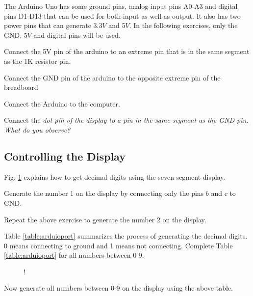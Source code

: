 The Arduino Uno has some ground pins, analog input pins A0-A3 and digital pins D1-D13 that can be used for both input as well as output. It also has two power pins that can generate 3.3$V$ and 5$V$.  In the following exercises, only the GND, 5$V$ and digital pins will be used.
%
%
\begin{problem}
	Connect the 5V pin of the arduino to an  extreme pin that is in the same segment as the 1K resistor pin. 
	\end{problem}	
\begin{problem}
	Connect the GND pin of the arduino to the opposite extreme pin of the breadboard
\end{problem}
\begin{problem}
	Connect the Arduino to the computer.
\end{problem}
\begin{problem}
	Connect the \em{dot} pin of the display to a pin in the same segment as the GND pin.  What do you observe?
\end{problem}
\subsection{Controlling the Display}
Fig. \ref{fig:sevenseg12} explains how to get decimal digits using the seven segment display. 
\begin{problem}
	Generate the number 1 on the display by connecting only the pins $b$ and $c$ to GND. 
\end{problem}	
\begin{problem}
	Repeat the above exercise to generate the number 2 on the display.
\end{problem}	
%
\begin{problem}
Table \ref{table:arduioport} summarizes the process of generating the decimal digits.  0 means connecting to ground and 1 means not connecting.  	Complete Table \ref{table:arduioport} for all numbers between 0-9.
\end{problem}	

%
%
\begin{figure}[!h]
\begin{center}
\resizebox {0.8\columnwidth} {!} {

}
\end{center}
\caption{}
\label{fig:sevenseg12}
\end{figure}
%
\begin{problem}
	Now generate all numbers between  0-9 on the display using the above table.
\end{problem}


